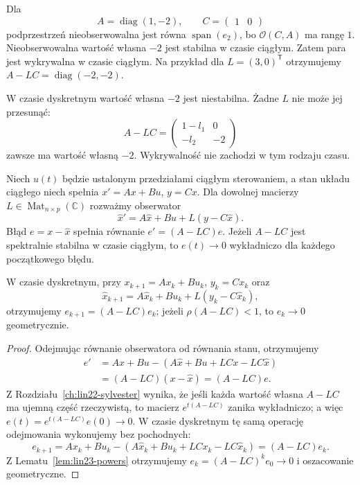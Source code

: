 \begin{przyklad}
\label{prz:lin25-detectable}
Dla
\[
 A=\operatorname{diag}(1,-2),
 \qquad C=\begin{pmatrix}1&0\end{pmatrix}
\]
podprzestrzeń nieobserwowalna
jest równa
\(\operatorname{span}(e_2)\),
bo \(\mathcal O(C,A)\)
ma rangę \(1\).
Nieobserwowalna wartość
własna \(-2\)
jest stabilna w czasie ciągłym.
Zatem para jest wykrywalna
w czasie ciągłym.
Na przykład dla
\(L=(3,0)^{\mathsf T}\)
otrzymujemy
\(A-LC=\operatorname{diag}(-2,-2)\).

W czasie dyskretnym
wartość własna \(-2\)
jest niestabilna.
Żadne \(L\)
nie może jej przesunąć:
\[
 A-LC=
 \begin{pmatrix}1-l_1&0\\-l_2&-2\end{pmatrix}
\]
zawsze ma wartość własną \(-2\).
Wykrywalność nie zachodzi
w tym rodzaju czasu.
\end{przyklad}

\begin{stwierdzenie}
\label{prop:lin25-observer}
Niech \(u(t)\)
będzie ustalonym
przedziałami ciągłym
sterowaniem, a stan
układu ciągłego
niech spełnia
\(x'=Ax+Bu\), \(y=Cx\).
Dla dowolnej macierzy
\(L\in\operatorname{Mat}_{n\times p}(\mathbb C)\)
rozważmy obserwator
\[
 \widehat x'
 =A\widehat x+Bu
  +L(y-C\widehat x).
\]
Błąd \(e=x-\widehat x\)
spełnia równanie
\(e'=(A-LC)e\).
Jeżeli \(A-LC\)
jest spektralnie stabilna
w czasie ciągłym,
to \(e(t)\to0\)
wykładniczo dla każdego
początkowego błędu.

W czasie dyskretnym,
przy \(x_{k+1}=Ax_k+Bu_k\),
\(y_k=Cx_k\) oraz
\[
 \widehat x_{k+1}
 =A\widehat x_k+Bu_k
  +L(y_k-C\widehat x_k),
\]
otrzymujemy
\(e_{k+1}=(A-LC)e_k\);
jeżeli \(\rho(A-LC)<1\),
to \(e_k\to0\) geometrycznie.
\end{stwierdzenie}
\begin{proof}
Odejmując równanie obserwatora
od równania stanu,
otrzymujemy
\[
 \begin{aligned}
 e'
 &=Ax+Bu-
    (A\widehat x+Bu+LCx-LC\widehat x)\\
 &=(A-LC)(x-\widehat x)
 =(A-LC)e.
 \end{aligned}
\]
Z
Rozdziału~\ref{ch:lin22-sylvester}
wynika, że jeśli każda wartość
własna \(A-LC\) ma ujemną
część rzeczywistą, to macierz
\(e^{t(A-LC)}\)
zanika wykładniczo;
a więc
\(e(t)=e^{t(A-LC)}e(0)\to0\).
W czasie dyskretnym
tę samą operację odejmowania
wykonujemy bez pochodnych:
\[
 e_{k+1}
 =Ax_k+Bu_k-
 (A\widehat x_k+Bu_k+LCx_k-LC\widehat x_k)
 =(A-LC)e_k.
\]
Z
Lematu~\ref{lem:lin23-powers}
otrzymujemy
\(e_k=(A-LC)^ke_0\to0\)
i oszacowanie geometryczne.
\end{proof}

